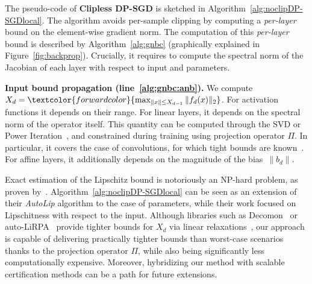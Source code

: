     The pseudo-code of \textbf{Clipless DP-SGD} is sketched in Algorithm~\ref{alg:noclipDP-SGDlocal}. The algorithm avoids per-sample clipping by computing a \textit{per-layer} bound on the element-wise gradient norm. The computation of this \textit{per-layer} bound is described by Algorithm~\ref{alg:gnbc} (graphically explained in Figure~\ref{fig:backprop}). Crucially, it requires to compute the spectral norm of the Jacobian of each layer with respect to input and parameters. 

    \textbf{Input bound propagation (line~\ref{alg:gnbc:anb}).} We compute $X_d=\textcolor{forwardcolor}{\max_{\|x\|\leq X_{d-1}}\|f_d(x)\|_2}$. For activation functions it depends on their range. For linear layers, it depends on the spectral norm of the operator itself. This quantity can be computed through the SVD or Power Iteration~\citep{trefethen2022numerical,miyato2018spectral}, and constrained during training using projection operator $\Pi$. In particular, it covers the case of convolutions, for which tight bounds are known~\citep{singla2021fantastic}. For affine layers, it additionally depends on the magnitude of the bias~$\|b_d\|$.  


    \begin{remark}\label{remark:forwardbounds}
        Exact estimation of the Lipschitz bound is notoriously an NP-hard problem, as proven by~\citep{virmaux2018lipschitz}. Algorithm~\ref{alg:noclipDP-SGDlocal} can be seen as an extension of their \textit{AutoLip} algorithm to the case of parameters, while their work focused on Lipschitness with respect to the input. Although libraries such as Decomon~\citep{airbus} or \mbox{auto-LiRPA}~\citep{xu2020automatic} provide tighter bounds for $X_d$ via linear relaxations~\citep{singh2019abstract,zhang2018efficient}, our approach is capable of delivering practically tighter bounds than worst-case scenarios thanks to the projection operator $\Pi$, while also being significantly less computationally expensive.  Moreover, hybridizing our method with scalable certification methods can be a path for future extensions.
    \end{remark} 
    
